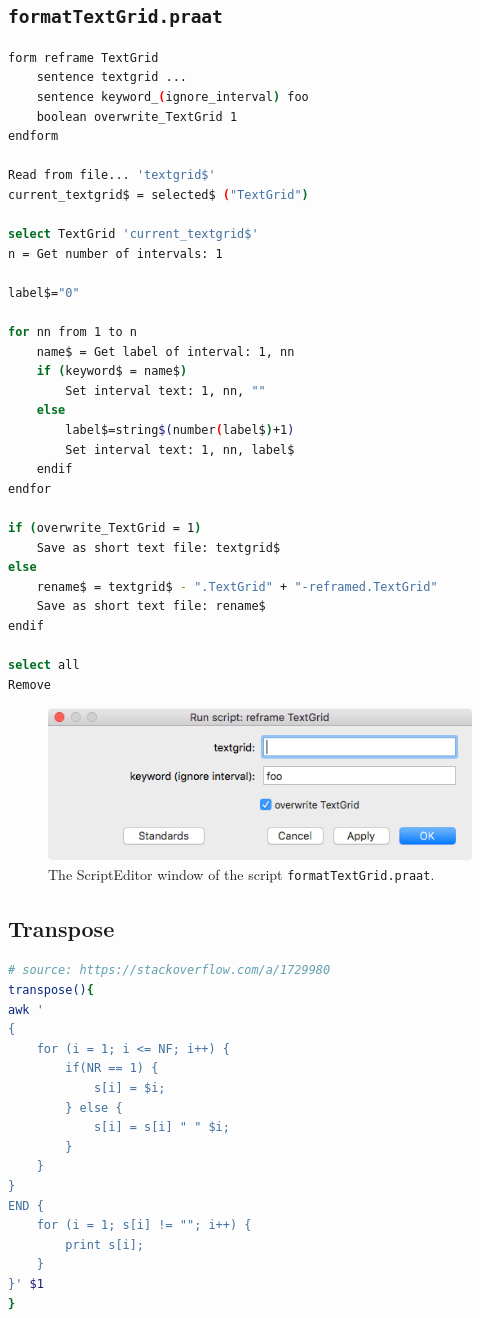 \documentclass{book}
\begin{document}
\subsection{\texttt{formatTextGrid.praat}}
\label{ftg}

\begin{lstlisting}[language=bash]
form reframe TextGrid
    sentence textgrid ...
	sentence keyword_(ignore_interval) foo
	boolean overwrite_TextGrid 1
endform

Read from file... 'textgrid$'
current_textgrid$ = selected$ ("TextGrid")

select TextGrid 'current_textgrid$'
n = Get number of intervals: 1

label$="0"

for nn from 1 to n
	name$ = Get label of interval: 1, nn
	if (keyword$ = name$)
		Set interval text: 1, nn, ""
	else
		label$=string$(number(label$)+1)
		Set interval text: 1, nn, label$
	endif
endfor

if (overwrite_TextGrid = 1)
	Save as short text file: textgrid$
else	
	rename$ = textgrid$ - ".TextGrid" + "-reframed.TextGrid"
	Save as short text file: rename$
endif

select all
Remove
\end{lstlisting}

\makeatletter
\setlength{\@fptop}{0pt}
\makeatother

\begin{figure}[!hbt]
	\begin{center}
		\includegraphics[scale=0.5]{img/7861}
		\caption{The ScriptEditor window of the script \texttt{formatTextGrid.praat}.}
		\label{fig:ftg}
	\end{center}
\end{figure}

\subsection{Transpose}
\label{trans}
\begin{lstlisting}[language=bash]
# source: https://stackoverflow.com/a/1729980
transpose(){
awk '
{
    for (i = 1; i <= NF; i++) {
        if(NR == 1) {
            s[i] = $i;
        } else {
            s[i] = s[i] " " $i;
        }
    }
}
END {
    for (i = 1; s[i] != ""; i++) {
        print s[i];
    }
}' $1
}
\end{lstlisting}
\end{document}
